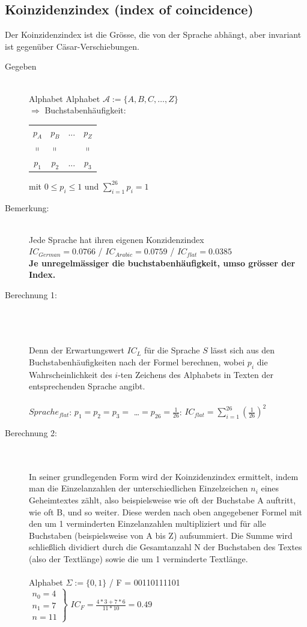 \documentclass[landscape,twocolumn,a4paper]{article}
\newcommand{\Pota}{\mathcal{A}}
\newcommand{\Ra}{\Rightarrow}
\newcommand{\Brackar}[2]{\left.\begin{array}{#1} #2 \end{array}\right\rbrace} %
\begin{document}
\subsection{Koinzidenzindex (index of coincidence)}
Der Koinzidenzindex ist die Grösse, die von der Sprache abhängt, aber invariant ist gegenüber Cäsar-Verschiebungen.
\begin{description}
	\item[Gegeben] \hfill \\
		Alphabet Alphabet $\Pota:=\{A,B,C,\dots,Z\}$\\ 
		$\Ra$ Buchstabenhäufigkeit: 
		\begin{tabular}{c c c c}
			$p_A$ & $p_B$ & ... & $p_Z$ \\
			$\shortparallel$ & $\shortparallel$ & & $\shortparallel$ \\
			$p_1$ & $p_2$ & ... & $p_3$ \\
		\end{tabular} 
		mit $0\leq p_i \leq 1$ und $\sum_{i=1}^{26} p_i=1$
	\item[Bemerkung:] \hfill \\
		Jede Sprache hat ihren eigenen Konzidenzindex \\
		$IC_{German}=0.0766$ / $IC_{Arabic}=0.0759$ / $IC_{flat}=0.0385$ \\
		\textbf{Je unregelmässiger die buchstabenhäufigkeit, umso grösser der Index.}
	\item[Berechnung 1:] \hfill \\
		  \\ \\
		Denn der Erwartungswert $IC_L$ für die Sprache $S$ lässt sich aus den Buchstabenhäufigkeiten nach der Formel  berechnen, wobei $p_i$ die Wahrscheinlichkeit des $i$-ten Zeichens des Alphabets in Texten der entsprechenden Sprache angibt. \\
		\\
		$Sprache_{flat}$: $p_1=p_2=p_3=$ \dots $=p_{26}=\frac{1}{26}$: $IC_{flat}=\sum^{26}_{i=1}(\frac{1}{26})^2$
	\item[Berechnung 2:] \hfill \\
		 \\
		In seiner grundlegenden Form wird der Koinzidenzindex ermittelt, indem man die Einzelanzahlen  der unterschiedlichen Einzelzeichen $n_i$ eines Geheimtextes zählt, also beispielsweise wie oft der Buchstabe A auftritt, wie oft B, und so weiter. Diese werden nach oben angegebener Formel mit den um 1 verminderten Einzelanzahlen multipliziert und für alle Buchstaben (beispielsweise von A bis Z) aufsummiert. Die Summe wird schließlich dividiert durch die Gesamtanzahl N der Buchstaben des Textes (also der Textlänge) sowie die um 1 verminderte Textlänge. \\
	\\
	Alphabet $\Sigma := \{0,1\}$ / F = 00110111101 \\
	$\Brackar{l}{n_0=4 \\ n_1=7 \\ \hline n=11 }$ $IC_F=\frac{4*3+7*6}{11*10}=0.49$ \\
	

\end{description}
\end{document}
